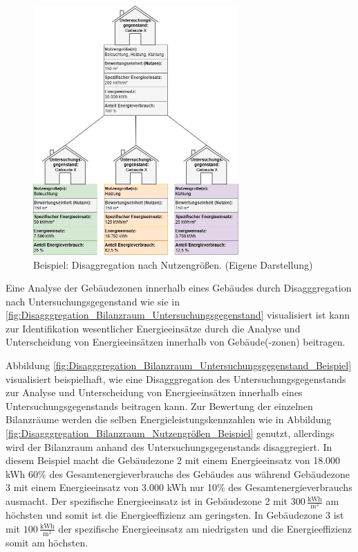 \begin{figure}[H]
    \centering
    \includegraphics[width=0.7\textwidth]{../../Ressourcen/Abbildungen/Nutzengröße_Bewertungseinheit_Zerlegt_Beispiel.jpg}
    \caption{Beispiel: Disaggregation nach Nutzengrößen. (Eigene Darstellung)}
    \label{fig:Disagggregation_Bilanzraum_Nutzengrößen_Beispiel}
\end{figure}


Eine Analyse der Gebäudezonen innerhalb eines Gebäudes durch Disagggregation nach Untersuchungsgegenstand wie sie in 
\eqref{fig:Disagggregation_Bilanzraum_Untersuchungsgegenstand} visualisiert ist kann zur Identifikation wesentlicher Energieeinsätze durch die Analyse und Unterscheidung 
von Energieeinsätzen innerhalb von Gebäude(-zonen) beitragen.



Abbildung \eqref{fig:Disagggregation_Bilanzraum_Untersuchungsgegenstand_Beispiel} visualisiert beispielhaft, wie eine Disagggregation des Untersuchungsgegenstands 
zur Analyse und Unterscheidung von Energieeinsätzen innerhalb eines Untersuchungsgegenstands beitragen kann.
Zur Bewertung der einzelnen Bilanzräume werden die selben Energieleistungskennzahlen wie in Abbildung \eqref{fig:Disagggregation_Bilanzraum_Nutzengrößen_Beispiel} 
genutzt, allerdings wird der Bilanzraum anhand des Untersuchungsgegenstands disaggregiert.
In diesem Beispiel macht die Gebäudezone 2 mit einem Energieeinsatz von 18.000 kWh 60\% des Gesamtenergieverbrauchs des Gebäudes aus während Gebäudezone 3 mit 
einem Energieeinsatz von 3.000 kWh nur 10\% des Gesamtenergieverbrauchs ausmacht.
Der spezifische Energieeinsatz ist in Gebäudezone 2 mit  \( 300 \,\frac{\text{kWh}}{\text{m}^2} \) am höchsten und somit ist die Energieeffizienz am geringsten. 
In Gebäudezone 3 ist mit \( 100 \,\frac{\text{kWh}}{\text{m}^2} \) der spezifische Energieeinsatz am niedrigsten und die Energieeffizienz somit am höchsten.



